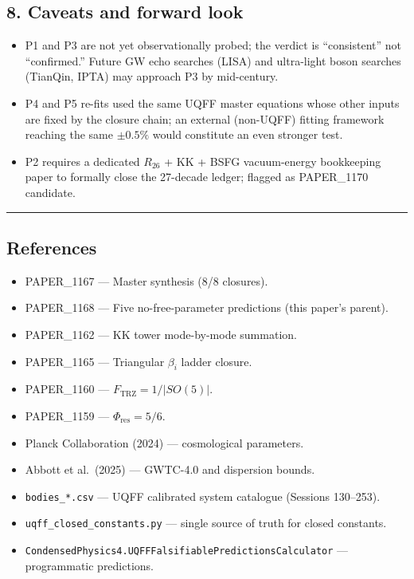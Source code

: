 \documentclass[
]{article}
\providecommand{\tightlist}{%
  \setlength{\itemsep}{0pt}\setlength{\parskip}{0pt}}
\begin{document}
\subsection{8. Caveats and forward look}\label{caveats-and-forward-look}

\begin{itemize}
\tightlist
\item
  P1 and P3 are not yet observationally probed; the verdict is
  ``consistent'' not ``confirmed.'' Future GW echo searches (LISA) and
  ultra-light boson searches (TianQin, IPTA) may approach P3 by
  mid-century.
\item
  P4 and P5 re-fits used the same UQFF master equations whose other
  inputs are fixed by the closure chain; an external (non-UQFF) fitting
  framework reaching the same \(\pm 0.5\%\) would constitute an even
  stronger test.
\item
  P2 requires a dedicated \(R_{26}\) + KK + BSFG vacuum-energy
  bookkeeping paper to formally close the 27-decade ledger; flagged as
  PAPER\_1170 candidate.
\end{itemize}

\begin{center}\rule{0.5\linewidth}{0.5pt}\end{center}

\subsection{References}\label{references}

\begin{itemize}
\tightlist
\item
  PAPER\_1167 --- Master synthesis (8/8 closures).
\item
  PAPER\_1168 --- Five no-free-parameter predictions (this paper's
  parent).
\item
  PAPER\_1162 --- KK tower mode-by-mode summation.
\item
  PAPER\_1165 --- Triangular \(\beta_i\) ladder closure.
\item
  PAPER\_1160 --- \(F_{\text{TRZ}} = 1/|SO(5)|\).
\item
  PAPER\_1159 --- \(\Phi_{\text{res}} = 5/6\).
\item
  Planck Collaboration (2024) --- cosmological parameters.
\item
  Abbott et al.~(2025) --- GWTC-4.0 and dispersion bounds.
\item
  \texttt{bodies\_*.csv} --- UQFF calibrated system catalogue (Sessions
  130--253).
\item
  \texttt{uqff\_closed\_constants.py} --- single source of truth for
  closed constants.
\item
  \texttt{CondensedPhysics4.UQFFFalsifiablePredictionsCalculator} ---
  programmatic predictions.
\end{itemize}
\end{document}
